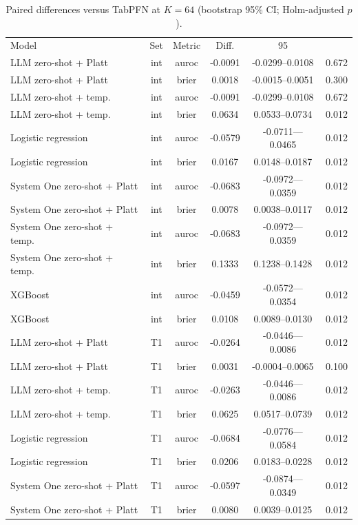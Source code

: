 \begin{table}[!t]
\caption{Paired differences versus TabPFN at $K{=}64$ (bootstrap 95\% CI; Holm-adjusted $p$).}
\label{tab:paired}
\centering
\footnotesize
\begin{tabular}{lccccc}
\hline
Model & Set & Metric & Diff. & 95\\%
LLM zero-shot + Platt & int & auroc & -0.0091 & -0.0299--0.0108 & 0.672 \\
LLM zero-shot + Platt & int & brier & 0.0018 & -0.0015--0.0051 & 0.300 \\
LLM zero-shot + temp. & int & auroc & -0.0091 & -0.0299--0.0108 & 0.672 \\
LLM zero-shot + temp. & int & brier & 0.0634 & 0.0533--0.0734 & 0.012 \\
Logistic regression & int & auroc & -0.0579 & -0.0711---0.0465 & 0.012 \\
Logistic regression & int & brier & 0.0167 & 0.0148--0.0187 & 0.012 \\
System One zero-shot + Platt & int & auroc & -0.0683 & -0.0972---0.0359 & 0.012 \\
System One zero-shot + Platt & int & brier & 0.0078 & 0.0038--0.0117 & 0.012 \\
System One zero-shot + temp. & int & auroc & -0.0683 & -0.0972---0.0359 & 0.012 \\
System One zero-shot + temp. & int & brier & 0.1333 & 0.1238--0.1428 & 0.012 \\
XGBoost & int & auroc & -0.0459 & -0.0572---0.0354 & 0.012 \\
XGBoost & int & brier & 0.0108 & 0.0089--0.0130 & 0.012 \\
LLM zero-shot + Platt & T1 & auroc & -0.0264 & -0.0446---0.0086 & 0.012 \\
LLM zero-shot + Platt & T1 & brier & 0.0031 & -0.0004--0.0065 & 0.100 \\
LLM zero-shot + temp. & T1 & auroc & -0.0263 & -0.0446---0.0086 & 0.012 \\
LLM zero-shot + temp. & T1 & brier & 0.0625 & 0.0517--0.0739 & 0.012 \\
Logistic regression & T1 & auroc & -0.0684 & -0.0776---0.0584 & 0.012 \\
Logistic regression & T1 & brier & 0.0206 & 0.0183--0.0228 & 0.012 \\
System One zero-shot + Platt & T1 & auroc & -0.0597 & -0.0874---0.0349 & 0.012 \\
System One zero-shot + Platt & T1 & brier & 0.0080 & 0.0039--0.0125 & 0.012 \\

\end{tabular}
\end{table}
